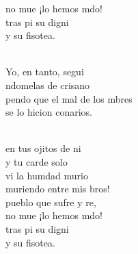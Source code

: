 \documentclass[12pt]{article}
\begin{document}
\begin{multicols*}{2}
\begin{cancion}
\begin{chorus}
	no mue ¡lo hemos mdo!\\
	tras pi su digni\\
	y su fisotea.\\
	\end{chorus}%
	\jump\\
	Yo, en tanto, segui\\
	ndomelas de crisano \\
	pendo que el mal de los mbres\\
	se lo hicion  conarios.\\\jump\\
	\begin{chorus}%
	en tus ojitos de ni\\
	y tu carde solo\\
	vi la humdad murio\\
	muriendo entre mis bros!\\
	 pueblo que sufre y re,\\
	no mue ¡lo hemos mdo!\\
	tras pi su digni\\
	y su fisotea.\\
	\end{chorus}%
	\jump\\
\end{cancion}%


\end{multicols*}
\end{document}
